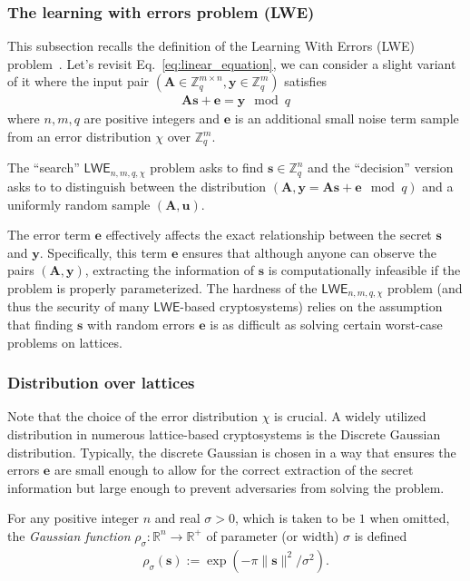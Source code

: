 \documentclass[cryptography,review,submit,pdftex,moreauthors,amsmath,amssymb,aps,strict]{Definitions/mdpi}
\begin{document}
\subsubsection{The learning with errors problem (LWE)}
This subsection recalls the definition of the Learning With Errors (LWE) problem~\cite{Pei16}. Let's revisit Eq.~\eqref{eq:linear_equation}, we can consider a slight variant of it where the input pair $(\mathbf{A}\in \mathbb{Z}^{m\times n}_q, \mathbf{y} \in \mathbb{Z}^m_q)$ satisfies
\begin{align}
    \mathbf{A}\mathbf{s} + \mathbf{e}= \mathbf{y}\mod q \label{eq:lwe}
\end{align}
where $n, m, q$ are positive integers and $\mathbf{e}$ is an additional small noise term sample from an error distribution $\chi$ over $\mathbb{Z}^m_q$. 

The ``search'' $\mathsf{LWE}_{n,m,q,\chi}$ problem asks to find $\mathbf{s}\in\mathbb{Z}^n_q$ and the ``decision'' version asks to to distinguish between the distribution $ (\mathbf{A},\mathbf{y}=\mathbf{A}\mathbf{s}+\mathbf{e} \mod q)$ and a uniformly random sample $(\mathbf{A},\mathbf{u})$.

The error term $\mathbf{e}$ effectively affects the exact relationship between the secret $\mathbf{s}$ and $\mathbf{y}$. Specifically, this term $\mathbf{e}$ ensures that although anyone can observe the pairs $(\mathbf{A},\mathbf{y})$, extracting the information of $\mathbf{s}$ is computationally infeasible if the problem is properly parameterized. The hardness of the $\mathsf{LWE}_{n,m,q,\chi}$ problem (and thus the security of many $\mathsf{LWE}$-based cryptosystems) relies on the assumption that finding $\mathbf{s}$ with random errors $\mathbf{e}$ is as difficult as solving certain worst-case problems on lattices.

\subsubsection{Distribution over lattices}
Note that the choice of the error distribution $\chi$ is crucial. A widely utilized distribution in numerous lattice-based cryptosystems is the Discrete Gaussian distribution. Typically, the discrete Gaussian is chosen in a way that ensures the errors $\mathbf{e}$ are small enough to allow for the correct extraction of the secret information but large enough to prevent adversaries from solving the problem.


For any positive integer $n$ and real $\sigma>0$, which is taken to be $1$ when omitted, the \textit{Gaussian function} $\rho_{\sigma}:\mathbb{R}^n\to \mathbb{R}^+$ of parameter (or width) $\sigma$ is defined 
\begin{align}
    \rho_{\sigma}(\mathbf{s}):=\exp(-\pi\|\mathbf{s}\|^2/\sigma^2).
\end{align}
\end{document}

